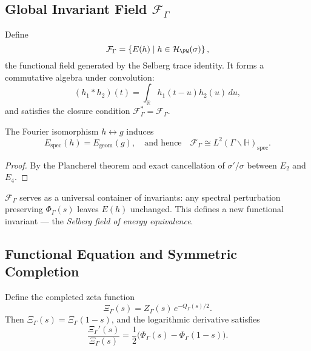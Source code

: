 \subsection{Global Invariant Field $\mathcal{F}_\Gamma$}\relax\hspace{0pt}
\label{subsec:invariant-field}\relax\hspace{0pt}

\begin{definition}\label{def:invariant-field}\relax
Define
\[
\mathcal{F}_\Gamma = \left\{
E(h)\;|\;h\in\mathcal{H}_{\PW}(\sigma)
\right\},
\]
the functional field generated by the Selberg trace identity.  
It forms a commutative algebra under convolution:
\[
(h_1*h_2)(t)=\int_\mathbb{R} h_1(t-u)h_2(u)\,du,
\]
and satisfies the closure condition $\mathcal{F}_\Gamma^\ast=\mathcal{F}_\Gamma$. %
\end{definition}

\begin{proposition}\label{prop:SG-duality}\relax
The Fourier isomorphism $h\leftrightarrow g$ induces
\[
E_{\text{spec}}(h)=E_{\text{geom}}(g), \quad \text{and hence}\quad
\mathcal{F}_\Gamma \cong L^2(\Gamma\backslash\mathbb{H})_\text{spec}.
\]
\end{proposition}

\begin{proof}\relax
By the Plancherel theorem and exact cancellation of $\sigma'/\sigma$ between $E_2$ and $E_4$. %
\end{proof}

\begin{remark}\label{rem:inv-principle}\relax
$\mathcal{F}_\Gamma$ serves as a universal container of invariants: any spectral perturbation preserving $\Phi_\Gamma(s)$ leaves $E(h)$ unchanged. This defines a new functional invariant — the \emph{Selberg field of energy equivalence}. %
\end{remark}

\subsection{Functional Equation and Symmetric Completion}\relax\hspace{0pt}
\label{subsec:functional-eq}\relax\hspace{0pt}

\begin{lemma}\label{lem:symmetric}\relax
Define the completed zeta function
\[
\Xi_\Gamma(s) = Z_\Gamma(s)\,e^{-Q_\Gamma(s)/2}.
\]
Then $\Xi_\Gamma(s)=\Xi_\Gamma(1-s)$, and the logarithmic derivative satisfies
\[
\frac{\Xi_\Gamma'(s)}{\Xi_\Gamma(s)} = \frac{1}{2}\big(\Phi_\Gamma(s)-\Phi_\Gamma(1-s)\big).
\]
\end{lemma}


